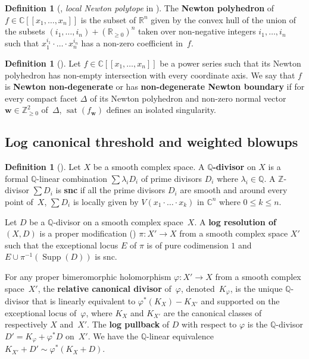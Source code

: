 \documentclass[a4paper, 12pt, oneside]{article}
\theoremstyle{plain}
\theoremstyle{definition}
\newtheorem{definition}[theorem]{Definition}
\theoremstyle{remark}
\numberwithin{theorem}{section}
\numberwithin{table}{section}
\numberwithin{equation}{theorem}
\begin{document}
\begin{definition}[{\cite[Section~12.7]{AGZV12a}, \emph{local Newton polytope} in \cite[Definition~2.14]{GLS07}}] \label{def:Newton polyhedron}
The \textbf{Newton polyhedron} of $f \in \mathbb C[[x_1, \ldots, x_n]]$ is the subset of $\mathbb R^n$ given by the convex hull of the union of the subsets $(i_1, \ldots, i_n) + (\mathbb R_{\geq0})^n$ taken over non-negative integers $i_1, \ldots, i_n$ such that $x_1^{i_1} \cdot \ldots \cdot x_n^{i_n}$ has a non-zero coefficient in~$f$.
\end{definition}

\begin{definition}[{\cite[Definition~I.2.15]{GLS07}}]
Let $f \in \mathbb C[[x_1, \ldots, x_n]]$ be a power series such that its Newton polyhedron has non-empty intersection with every coordinate axis. We say that $f$ is \textbf{Newton non-degenerate} or has \textbf{non-degenerate Newton boundary} if for every compact facet $\Delta$ of its Newton polyhedron and non-zero normal vector $\bm w \in \mathbb Z_{\geq0}^2$ of~$\Delta$, $\operatorname{sat}(f_{\bm w})$ defines an isolated singularity.
\end{definition}

\subsection{Log canonical threshold and weighted blowups}

\begin{definition}[{\cite[Notation~0.4]{KM98}}]
Let $X$ be a smooth complex space. A \textbf{$\mathbb Q$-divisor} on $X$ is a formal $\mathbb Q$-linear combination $\sum \lambda_i D_i$ of prime divisors $D_i$ where $\lambda_i \in \mathbb Q$. A $\mathbb Z$-divisor $\sum D_i$ is \textbf{snc} if all the prime divisors $D_i$ are smooth and around every point of~$X$, $\sum D_i$ is locally given by $V(x_1 \cdot \ldots \cdot x_k)$ in $\mathbb C^n$ where $0 \leq k \leq n$.

Let $D$ be a $\mathbb Q$-divisor on a smooth complex space~$X$. A \textbf{log resolution of $(X, D)$} is a
proper modification (\cite[Definition VII.1.1]{CDG+94}) $\pi\colon X' \to X$ from a smooth complex space $X'$
such that the exceptional locus $E$ of $\pi$ is of pure codimension $1$ and $E \cup \pi^{-1}(\operatorname{Supp}(D))$ is snc.

For any proper bimeromorphic holomorphism $\varphi\colon X' \to X$ from a smooth complex space~$X'$, the \textbf{relative canonical divisor} of~$\varphi$, denoted~$K_\varphi$, is the unique $\mathbb Q$-divisor that is linearly equivalent to $\varphi^*(K_X) - K_{X'}$ and supported on the exceptional locus of~$\varphi$, where $K_X$ and $K_{X'}$ are the canonical classes of respectively $X$ and~$X'$. The \textbf{log pullback} of $D$ with respect to $\varphi$ is the $\mathbb Q$-divisor $D' = K_\varphi + \varphi^* D$ on~$X'$. We have the $\mathbb Q$-linear equivalence $K_{X'} + D' \sim \varphi^*(K_X + D)$.
\end{definition}
\end{document}
